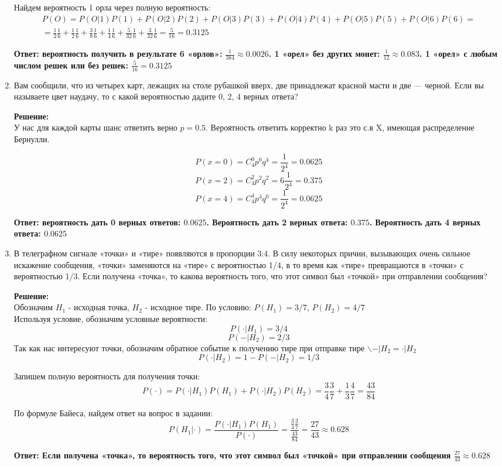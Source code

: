 \documentclass[a4paper,12pt]{article}
\begin{document}
\begin{enumerate}
Найдем вероятность 1 орла через полную вероятность:
\begin{align*}P(O) = P(O|1)P(1) +P(O|2)P(2)+P(O|3)P(3)+P(O|4)P(4)+P(O|5)P(5)+P(O|6)P(6)=\\=\frac{1}{2}\frac{1}{6}+\frac{1}{2}\frac{1}{6}+\frac{3}{8}\frac{1}{6}+\frac{1}{4}\frac{1}{6}+\frac{5}{32}\frac{1}{6}+\frac{3}{32}\frac{1}{6}=\frac{5}{16}=0.3125\end{align*}


\textbf{Ответ: вероятность получить в результате 6 «орлов»: $\frac{1}{384}\approx0.0026$. 1 «орел» без других монет: $\frac{1}{12}\approx0.083$. 1 «орел» с любым числом решек или без решек: $\frac{5}{16}=0.3125$ }

\item Вам сообщили, что из четырех карт, лежащих на столе рубашкой вверх, две принадлежат красной масти и две — черной. Если вы называете цвет наудачу, то с какой вероятностью дадите 0, 2, 4 верных ответа?

\textbf{Решение:}\\
У нас для каждой карты шанс ответить верно $p=0.5$. Вероятность ответить корректно k раз это с.в X, имеющая распределение Бернулли.

$$P(x=0) = C_4^0 p^0 q^4 = \frac{1}{2^4}=0.0625$$
$$P(x=2) = C_4^2 p^2 q^2 = 6 \frac{1}{2^4}=0.375$$
$$P(x=4) = C_4^4 p^4 q^0 = \frac{1}{2^4}=0.0625$$

\textbf{Ответ: вероятность дать 0 верных ответов: $0.0625$. Вероятность дать 2 верных ответа: $0.375$. Вероятность дать 4 верных ответа: $0.0625$}

\item В телеграфном сигнале «точки» и «тире» появляются в пропорции 3:4. В силу некоторых причин, вызывающих очень сильное искажение сообщения, «точки» заменяются на «тире» с вероятностью 1/4, в то время как «тире» превращаются в «точки» с вероятностью 1/3. Если получена «точка», то какова вероятность того, что этот символ был «точкой» при отправлении сообщения?

\textbf{Решение:}\\
Обозначим $H_1$ - исходная точка, $H_2$ - исходное тире.
По условию: $P(H_1)=3/7$, $P(H_2)=4/7$\\
Используя условие, обозначим условные вероятности: $$P(\cdot|H_1)=3/4$$
$$P(-|H_2)=2/3$$
Так как нас интересуют точки, обозначим обратное событие к получению тире при отправке тире $ \backslash  {-|H_2}=\cdot|H_2$
$$P(\cdot|H_2)=1-P(-|H_2)=1/3$$

Запишем полную вероятность для получения точки:
$$P(\cdot) = P(\cdot|H_1)P(H_1)+P(\cdot|H_2)P(H_2) = \frac{3}{4}\frac{3}{7}+\frac{1}{3}\frac{4}{7}=\frac{43}{84}$$

По формуле Байеса, найдем ответ на вопрос в задании:
$$P(H_1|\cdot) = \frac{P(\cdot|H_1)P(H_1)}{P(\cdot)}=\frac{\frac{3}{4}\frac{3}{7}}{\frac{43}{84}}=\frac{27}{43}\approx0.628$$

\textbf{Ответ: Если получена «точка», то вероятность того, что этот символ был «точкой» при отправлении сообщения $\frac{27}{43}\approx0.628$}

\end{enumerate}
\end{document}

